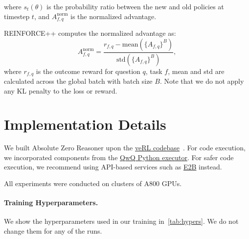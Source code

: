 \documentclass{article}
\begin{document}
where \(s_t(\theta)\) is the probability ratio between the new and old policies at timestep \(t\), and \(A^{\text{norm}}_{f,q}\) is the normalized advantage.

REINFORCE++ computes the normalized advantage as:
\begin{equation}
A^{\text{norm}}_{f,q} = \frac{r_{f,q} - \text{mean}(\{A_{f,q}\}^B)}{\text{std}(\{A_{f,q}\}^B)},
\end{equation}
where \(r_{f,q}\) is the outcome reward for question \(q\), task \(f\), mean and std are calculated across the global batch with batch size \(B\). Note that we do not apply any KL penalty to the loss or reward.

\section{Implementation Details}
We built Absolute Zero Reasoner upon the \href{https://github.com/volcengine/verl}{veRL codebase}~\citep{sheng2024hybridflow}. For code execution, we incorporated components from the \href{https://github.com/QwenLM/QwQ/blob/main/eval/eval/math_opensource_utils/python_executor.py}{QwQ Python executor}. For safer code execution, we recommend using API-based services such as \href{https://e2b.dev/}{E2B}  instead.

All experiments were conducted on clusters of A800 GPUs.

\paragraph{Training Hyperparameters.} We show the hyperparameters used in our training in~\cref{tab:hypers}. We do not change them for any of the runs.
\end{document}
